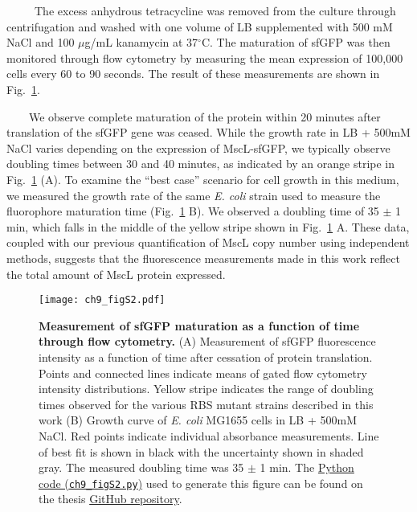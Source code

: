 \documentclass[12pt]{caltech_thesis}
\begin{document}
~~~~~The excess anhydrous tetracycline was removed from the culture
through centrifugation and washed with one volume of LB supplemented
with 500 mM NaCl and 100 \(\mu\)g/mL kanamycin at 37\(^\circ\)C. The
maturation of sfGFP was then monitored through flow cytometry by
measuring the mean expression of 100,000 cells every 60 to 90 seconds.
The result of these measurements are shown in
Fig.~\ref{fig:maturation_time}.

~~~~We observe complete maturation of the protein within 20 minutes
after translation of the sfGFP gene was ceased. While the growth rate in
LB + 500mM NaCl varies depending on the expression of MscL-sfGFP, we
typically observe doubling times between 30 and 40 minutes, as indicated
by an orange stripe in Fig.~\ref{fig:maturation_time} (A). To examine
the ``best case'' scenario for cell growth in this medium, we measured
the growth rate of the same \emph{E. coli} strain used to measure the
fluorophore maturation time (Fig.~\ref{fig:maturation_time} B). We
observed a doubling time of 35 \(\pm\) 1 min, which falls in the middle
of the yellow stripe shown in Fig.~\ref{fig:maturation_time} A. These
data, coupled with our previous quantification of MscL copy number using
independent methods, suggests that the fluorescence measurements made in
this work reflect the total amount of MscL protein expressed.

\hypertarget{fig:maturation_time}{%
\begin{figure}
\centering
\texttt{[image: ch9\_figS2.pdf]}
\caption[{Measurement of sfGFP maturation as a function of time through
flow cytometry.}]{\textbf{Measurement of sfGFP maturation as a function
of time through flow cytometry.} (A) Measurement of sfGFP fluorescence
intensity as a function of time after cessation of protein translation.
Points and connected lines indicate means of gated flow cytometry
intensity distributions. Yellow stripe indicates the range of doubling
times observed for the various RBS mutant strains described in this work
(B) Growth curve of \emph{E. coli} MG1655 cells in LB + 500mM NaCl. Red
points indicate individual absorbance measurements. Line of best fit is
shown in black with the uncertainty shown in shaded gray. The measured
doubling time was 35 \(\pm\) 1 min. The
\href{https://github.com/gchure/phd/blob/master/src/chapter_09/code/ch9_figS2.py}{Python
code (\texttt{ch9\_figS2.py})} used to generate this figure can be found
on the thesis \href{https://github.com/gchure/phd}{GitHub repository}.}
\label{fig:maturation_time}
\end{figure}
}
\end{document}
